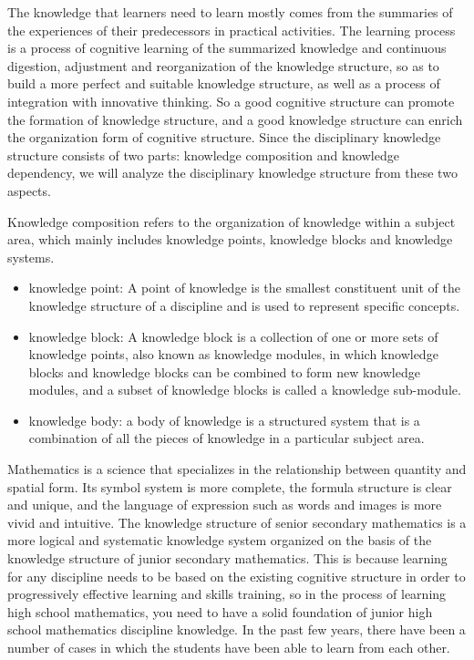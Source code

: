 The knowledge that learners need to learn mostly comes from the summaries of the experiences of their predecessors in practical activities. The learning process is a process of cognitive learning of the summarized knowledge and continuous digestion, adjustment and reorganization of the knowledge structure, so as to build a more perfect and suitable knowledge structure, as well as a process of integration with innovative thinking. So a good cognitive structure can promote the formation of knowledge structure, and a good knowledge structure can enrich the organization form of cognitive structure. Since the disciplinary knowledge structure consists of two parts: knowledge composition and knowledge dependency, we will analyze the disciplinary knowledge structure from these two aspects.

Knowledge composition refers to the organization of knowledge within a subject area, which mainly includes knowledge points, knowledge blocks and knowledge systems.
\begin{itemize}
	\item knowledge point: A point of knowledge is the smallest constituent unit of the knowledge structure of a discipline and is used to represent specific concepts.
	\item knowledge block: A knowledge block is a collection of one or more sets of knowledge points, also known as knowledge modules, in which knowledge blocks and knowledge blocks can be combined to form new knowledge modules, and a subset of knowledge blocks is called a knowledge sub-module.
	\item knowledge body: a body of knowledge is a structured system that is a combination of all the pieces of knowledge in a particular subject area.
\end{itemize}


Mathematics is a science that specializes in the relationship between quantity and spatial form. Its symbol system is more complete, the formula structure is clear and unique, and the language of expression such as words and images is more vivid and intuitive. The knowledge structure of senior secondary mathematics is a more logical and systematic knowledge system organized on the basis of the knowledge structure of junior secondary mathematics. This is because learning for any discipline needs to be based on the existing cognitive structure in order to progressively effective learning and skills training, so in the process of learning high school mathematics, you need to have a solid foundation of junior high school mathematics discipline knowledge. In the past few years, there have been a number of cases in which the students have been able to learn from each other.

